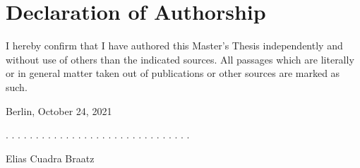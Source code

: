 \documentclass[a4paper,11pt]{article}
\newcommand{\thesistype}{Master's Thesis}
\newcommand{\thesisauthor}{Elias Cuadra Braatz}
\newcommand{\thesisdate}{October 24, 2021}
\begin{document}




\newpage
\thispagestyle{empty}
\hypertarget{declaration-of-authorship}{%
\section*{Declaration of Authorship}\label{declaration-of-authorship}}

I hereby confirm that I have authored this \thesistype{} independently and
without use of others than the indicated sources. All passages which are
literally or in general matter taken out of publications or other sources are
marked as such.
\vspace{1cm}

Berlin, \thesisdate{}
\vspace{3cm}

. . . . . . . . . . . . . . . . . . . . . . . . . . . . . . .
\vspace{0.1cm}

\thesisauthor{}
\end{document}
